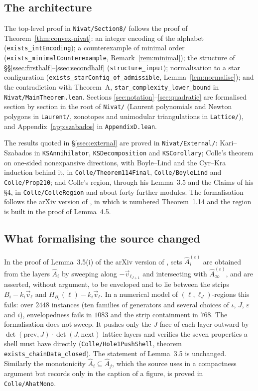 \documentclass[11pt,reqno]{amsart}
\theoremstyle{plain}
\theoremstyle{definition}
\theoremstyle{remark}
\theoremstyle{plain}
\theoremstyle{remark}
\theoremstyle{definition}
\numberwithin{equation}{section}
\begin{document}
\subsection*{The architecture}
The top-level proof in \texttt{Nivat/Section8/} follows the proof of
Theorem~\ref{thm:convex-nivat}: an integer encoding of the alphabet
(\texttt{exists\_intEncoding}); a counterexample of minimal order
(\texttt{exists\_minimalCounterexample}, Remark~\ref{rem:minimal}); the
structure of \S\S\ref{ssec:firsthalf}--\ref{ssec:secondhalf}
(\texttt{structure\_input}); normalisation to a star configuration
(\texttt{exists\_starConfig\_of\_admissible}, Lemma~\ref{lem:normalise}); and
the contradiction with Theorem~A, \texttt{star\_complexity\_lower\_bound} in
\texttt{Nivat/MainTheorem.lean}.  Sections
\ref{sec:notation}--\ref{sec:quadratic} are formalised section by section in
the root of \texttt{Nivat/} (Laurent polynomials and Newton polygons in
\texttt{Laurent/}, zonotopes and unimodular triangulations in
\texttt{Lattice/}), and Appendix~\ref{app:szabados} in
\texttt{AppendixD.lean}.

The results quoted in \S\ref{ssec:external} are proved in
\texttt{Nivat/External/}: Kari--Szabados in \texttt{KSAnnihilator},
\texttt{KSDecomposition} and \texttt{KSCorollary}; Colle's theorem on
one-sided nonexpansive directions, with Boyle--Lind and the Cyr--Kra induction
behind it, in \texttt{Colle/Theorem114Final}, \texttt{Colle/BoyleLind} and
\texttt{Colle/Prop210}; and Colle's region, through his Lemma~3.5 and the
Claims of his \S4, in \texttt{Colle/ColleRegion} and about forty further
modules.  The formalisation follows the arXiv version of \cite{Colle23a}, in
which \cite[Theorem~1.9]{Colle23a} is numbered Theorem~1.14 and the region is
built in the proof of Lemma~4.5.

\subsection*{What formalising the source changed}
In the proof of Lemma~3.5(i) of the arXiv version of \cite{Colle23a}, sets
$\hat A_i^{(\varepsilon)}$ are obtained from the layers $\hat A_i$ by sweeping
along $-\vec v_{\ell_{J+1}}$ and intersecting with $\hat A_\infty^{(\varepsilon)}$,
and are asserted, without argument, to be enveloped and to lie between the
strips $B_i-k_i\vec v_\ell$ and $H_{B_i}(\ell)-k_i\vec v_\ell$.  In a numerical
model of $(\ell,\ell_J)$-regions this fails: over $2448$ instances
(ten families of generators and several choices of $\iota$, $J$, $\varepsilon$
and $i$), envelopedness fails in $1083$ and the strip containment in $768$.
The formalisation does not sweep.  It pushes only the $J$-face of each layer
outward by $\det(\text{prev},J)\cdot\det(J,\text{next})$ lattice layers and
verifies the seven properties a shell must have directly
(\texttt{Colle/Hole1PushShell}, theorem \texttt{exists\_chainData\_closed}).  The
statement of Lemma~3.5 is unchanged.  Similarly the monotonicity
$\hat A_i\subseteq\hat A_j$, which the source uses in a compactness argument but
records only in the caption of a figure, is proved in \texttt{Colle/AhatMono}.
\end{document}
